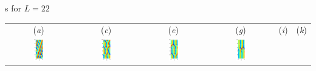 \documentclass{theo1poster}[2003/04/25]
\begin{document}
\begin{poster}{3}
\begin{sheet}{\Rpo s for $L=22$}
\begin{center}
\begin{tabular}{cccccc} (\textit{a}) & (\textit{c}) & (\textit{e}) &
                        (\textit{g}) & (\textit{i}) & (\textit{k})\\
\includegraphics[width=0.15\textwidth]{../../figs/ks22rpo016.3-02.86.eps}\hspace{-4ex} &
\includegraphics[width=0.15\textwidth]{../../figs/ks22rpo033.5-04.04.eps}\hspace{-4ex} &
\includegraphics[width=0.15\textwidth]{../../figs/ks22rpo047.6-05.68.eps}\hspace{-4ex} &
\includegraphics[width=0.15\textwidth]{../../figs/ks22rpo071.7-05.50.eps}\hspace{-4ex} &

\end{tabular}
\end{center}
\end{sheet}
\end{poster}
\end{document}

